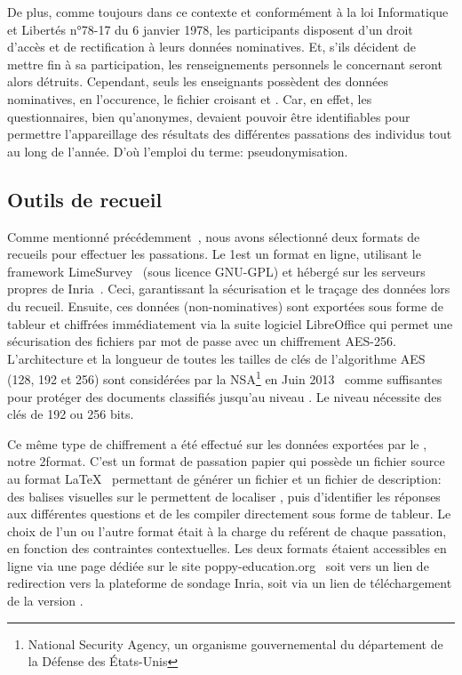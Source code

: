     De plus, comme toujours dans ce contexte et conformément à la loi Informatique et Libertés n°78-17 du 6 janvier 1978, les participants disposent d’un droit d’accès et de rectification à leurs données nominatives. Et, s'ils décident de mettre fin à sa participation, les renseignements personnels le concernant seront alors détruits.
    Cependant, seuls les enseignants possèdent des données nominatives, en l'occurence, le fichier croisant  et . Car, en effet, les questionnaires, bien qu'anonymes, devaient pouvoir être identifiables pour permettre l'appareillage des résultats des différentes passations des individus tout au long de l'année. D'où l'emploi du terme: pseudonymisation.
  \subsection{Outils de recueil}
    Comme mentionné précédemment~, nous avons sélectionné deux formats de recueils pour effectuer les passations. 
    Le 1\ier est un format en ligne, utilisant le framework LimeSurvey~ (sous licence GNU-GPL) et hébergé sur les serveurs propres de Inria~. Ceci, garantissant la sécurisation et le traçage des données lors du recueil. Ensuite, ces données (non-nominatives) sont exportées sous forme de tableur et chiffrées immédiatement via la suite logiciel LibreOffice qui permet une sécurisation des fichiers par mot de passe avec un chiffrement AES-256. L'architecture et la longueur de toutes les tailles de clés de l'algorithme AES (128, 192 et 256) sont considérées par la NSA\footnote{National Security Agency, un organisme gouvernemental du département de la Défense des États-Unis} en Juin 2013~ comme suffisantes pour protéger des documents classifiés jusqu'au niveau . Le niveau  nécessite des clés de 192 ou 256 bits. \par%
    Ce même type de chiffrement a été effectué sur les données exportées par le , notre 2\nd format. C'est un format de passation papier qui possède un fichier source au format \LaTeX{}~ permettant de générer un fichier  et un fichier de description: des balises visuelles sur le  permettent de localiser , puis d'identifier  les réponses aux différentes questions et de les compiler directement sous forme de tableur.
    Le choix de l'un ou l'autre format était à la charge du reférent de chaque passation, en fonction des contraintes contextuelles. Les deux formats étaient accessibles en ligne via une page dédiée sur le site poppy-education.org~ soit vers un lien de redirection vers la plateforme de sondage Inria, soit via un lien de téléchargement de la version .
